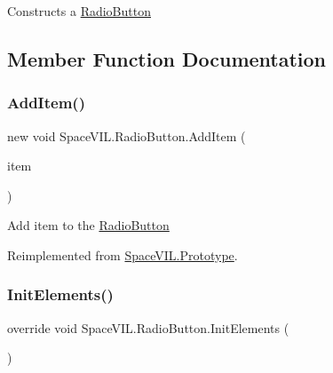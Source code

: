 Constructs a \mbox{\hyperlink{class_space_v_i_l_1_1_radio_button}{Radio\+Button}} 



\subsection{Member Function Documentation}
\mbox{\label{class_space_v_i_l_1_1_radio_button_a43667256c2474219e4772d2dbb112367}} 
\subsubsection{\texorpdfstring{Add\+Item()}{AddItem()}}
{\footnotesize\ttfamily new void Space\+V\+I\+L.\+Radio\+Button.\+Add\+Item (\begin{DoxyParamCaption}\item[{\mbox{\hyperlink{interface_space_v_i_l_1_1_core_1_1_i_base_item}{I\+Base\+Item}}}]{item }\end{DoxyParamCaption})\hspace{0.3cm}{\ttfamily [virtual]}}



Add item to the \mbox{\hyperlink{class_space_v_i_l_1_1_radio_button}{Radio\+Button}} 



Reimplemented from \mbox{\hyperlink{class_space_v_i_l_1_1_prototype}{Space\+V\+I\+L.\+Prototype}}.

\mbox{\label{class_space_v_i_l_1_1_radio_button_a2f31e5a88432a2bff6a9a9608da0d93f}} 
\subsubsection{\texorpdfstring{Init\+Elements()}{InitElements()}}
{\footnotesize\ttfamily override void Space\+V\+I\+L.\+Radio\+Button.\+Init\+Elements (\begin{DoxyParamCaption}{ }\end{DoxyParamCaption})\hspace{0.3cm}{\ttfamily [virtual]}}



